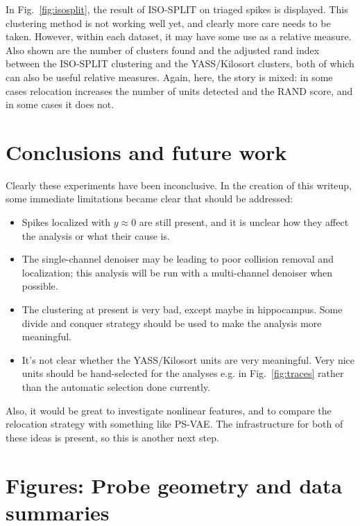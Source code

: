\documentclass[
  12pt,
]{article}
\theoremstyle{plain}
\theoremstyle{definition}
\theoremstyle{remark}
\newcommand{\1}[1]{\mathbb{1}_{{#1}}}
\begin{document}
In Fig.~\ref{fig:isosplit}, the result of ISO-SPLIT on triaged spikes is displayed. This clustering method is not working well yet, and clearly more care needs to be taken. However, within each dataset, it may have some use as a relative measure. Also shown are the number of clusters found and the adjusted rand index between the ISO-SPLIT clustering and the YASS/Kilosort clusters, both of which can also be useful relative measures. Again, here, the story is mixed: in some cases relocation increases the number of units detected and the RAND score, and in some cases it does not.


\section{Conclusions and future work}

Clearly these experiments have been inconclusive. In the creation of this writeup, some immediate limitations became clear that should be addressed:
\begin{itemize}
\item Spikes localized with $y\approx0$ are still present, and it is unclear how they affect the analysis or what their cause is.
\item The single-channel denoiser may be leading to poor collision removal and localization; this analysis will be run with a multi-channel denoiser when possible.
\item The clustering at present is very bad, except maybe in hippocampus. Some divide and conquer strategy should be used to make the analysis more meaningful.
\item It's not clear whether the YASS/Kilosort units are very meaningful. Very nice units should be hand-selected for the analyses e.g. in Fig.~\ref{fig:traces} rather than the automatic selection done currently.
\end{itemize}

Also, it would be great to investigate nonlinear features, and to compare the relocation strategy with something like PS-VAE. The infrastructure for both of these ideas is present, so this is another next step.




\appendix
{}

\pagebreak

\section{Figures: Probe geometry and data summaries}
\end{document}
